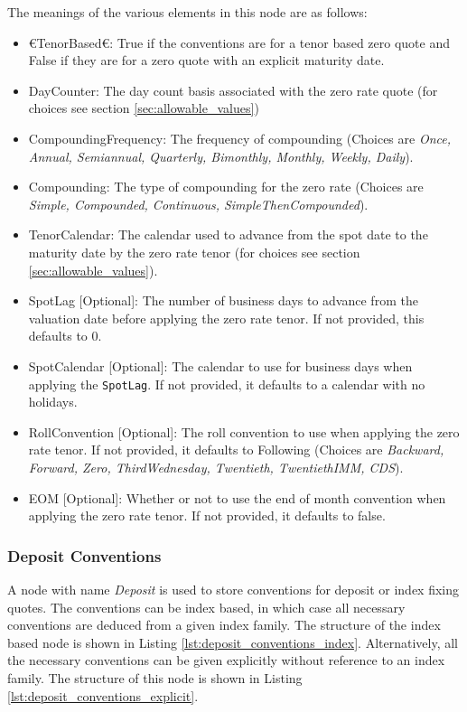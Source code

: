 The meanings of the various elements in this node are as follows:
\begin{itemize}
\item €TenorBased€: True if the conventions are for a tenor based zero quote and False if they are
for a zero quote with an explicit maturity date.
\item DayCounter: The day count basis associated with the zero rate quote (for choices see section
\ref{sec:allowable_values})
\item CompoundingFrequency: The frequency of compounding (Choices are {\em Once, Annual, Semiannual, Quarterly,
Bimonthly, Monthly, Weekly, Daily}).
\item Compounding: The type of compounding for the zero rate (Choices are {\em Simple, Compounded, Continuous,
SimpleThenCompounded}).
\item TenorCalendar: The calendar used to advance from the spot date to the maturity date by the zero rate tenor (for
choices see section \ref{sec:allowable_values}).
\item SpotLag [Optional]: The number of business days to advance from the valuation date before applying the zero rate
tenor. If not provided, this defaults to 0.
\item SpotCalendar [Optional]: The calendar to use for business days when applying the \lstinline!SpotLag!. If not
provided, it defaults to a calendar with no holidays.
\item RollConvention [Optional]: The roll convention to use when applying the zero rate tenor. If not provided, it
defaults to Following (Choices are {\em Backward, Forward, Zero, ThirdWednesday, Twentieth, TwentiethIMM, CDS}).
\item EOM [Optional]: Whether or not to use the end of month convention when applying the zero rate tenor. If not
provided, it defaults to false.
\end{itemize}

\subsubsection{Deposit Conventions}

A node with name \emph{Deposit} is used to store conventions for deposit or index fixing quotes. The conventions can be
index based, in which case all necessary conventions are deduced from a given index family. The structure of the index
based node is shown in Listing \ref{lst:deposit_conventions_index}. Alternatively, all the necessary conventions can be
given explicitly without reference to an index family. The structure of this node is shown in Listing
\ref{lst:deposit_conventions_explicit}.

